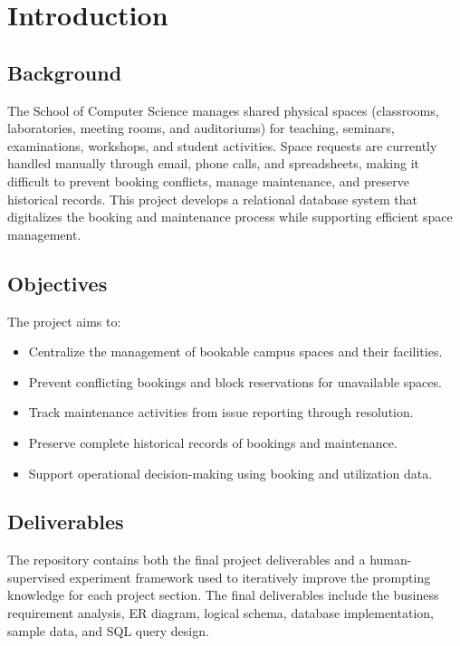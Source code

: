 \section{Introduction}

\subsection{Background}

The School of Computer Science manages shared physical spaces (classrooms, laboratories, meeting rooms, and auditoriums) for teaching, seminars, examinations, workshops, and student activities. Space requests are currently handled manually through email, phone calls, and spreadsheets, making it difficult to prevent booking conflicts, manage maintenance, and preserve historical records. This project develops a relational database system that digitalizes the booking and maintenance process while supporting efficient space management.

\subsection{Objectives}

The project aims to:

\begin{itemize}
	\item Centralize the management of bookable campus spaces and their facilities.
	\item Prevent conflicting bookings and block reservations for unavailable spaces.
	\item Track maintenance activities from issue reporting through resolution.
	\item Preserve complete historical records of bookings and maintenance.
	\item Support operational decision-making using booking and utilization data.
\end{itemize}

\subsection{Deliverables}

The repository contains both the final project deliverables and a human-supervised experiment framework used to iteratively improve the prompting knowledge for each project section. The final deliverables include the business requirement analysis, ER diagram, logical schema, database implementation, sample data, and SQL query design.

